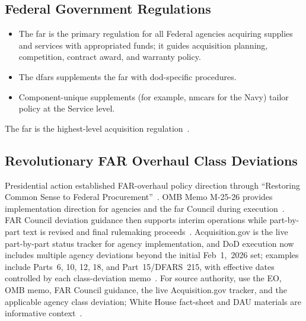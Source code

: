 \documentclass[../main.tex]{subfiles}
\begin{document}
\subsection{Federal Government Regulations}
\begin{itemize}
  \item The \ac{far} is the primary regulation for all Federal agencies acquiring supplies and services with appropriated funds; it guides acquisition planning, competition, contract award, and warranty policy.
  \item The \ac{dfars} supplements the \ac{far} with \ac{dod}-specific procedures.
  \item Component-unique supplements (for example, \ac{nmcars} for the Navy) tailor policy at the Service level.
\end{itemize}
The \ac{far} is the highest-level acquisition regulation~\autocite{edo-3-3-1-acq-policy-players-2025}.

\subsection{Revolutionary FAR Overhaul Class Deviations}
Presidential action established FAR-overhaul policy direction through ``Restoring Common Sense to Federal Procurement''~\autocite{WH-EO-Restoring-Common-Sense-Procurement-2025}. OMB Memo M-25-26 provides implementation direction for agencies and the \ac{far} Council during execution~\autocite{OMB-M-25-26-Overhauling-FAR-2025}. FAR Council deviation guidance then supports interim operations while part-by-part text is revised and final rulemaking proceeds~\autocite{FAR-Council-Deviation-Guidance-RFO-2025}. Acquisition.gov is the live part-by-part status tracker for agency implementation, and DoD execution now includes multiple agency deviations beyond the initial Feb~1,~2026 set; examples include Parts~6, 10, 12, 18, and Part~15/DFARS~215, with effective dates controlled by each class-deviation memo~\autocite{FAR-Overhaul-Deviation-Guide-2026,DoD-RFO-Deviation-Part6-2026,DoD-RFO-Deviation-Part10-2026,DoD-RFO-Deviation-Part12-2026,DoD-RFO-Deviation-Part18-2026,DFARS-Part215-Deviation-2026}. For source authority, use the EO, OMB memo, FAR Council guidance, the live Acquisition.gov tracker, and the applicable agency class deviation; White House fact-sheet and DAU materials are informative context~\autocite{WH-FactSheet-Restoring-Common-Sense-Procurement-2025,DAU-FAR-Overhaul-Announcement-2025}.

\end{document}
